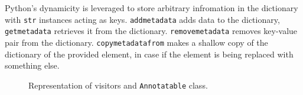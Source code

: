 Python's dynamicity is leveraged to store arbitrary infromation in the dictionary with \texttt{str} instances acting as keys. \texttt{addmetadata} adds data to the dictionary, \texttt{getmetadata} retrieves it from the dictionary. \texttt{removemetadata} removes key-value pair from the dictionary. \texttt{copymetadatafrom} makes a shallow copy of the dictionary of the provided element, in case if the element is being replaced with something else.

\begin{figure}[ht]
	\centering
	\caption{Representation of visitors and \texttt{Annotatable} class.}
\label{class-diagram-visitors}
\end{figure}

\FloatBarrier
